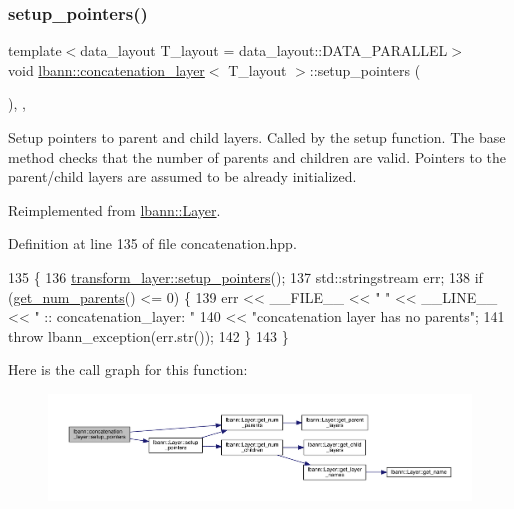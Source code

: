 \subsubsection{\texorpdfstring{setup\+\_\+pointers()}{setup\_pointers()}}
{\footnotesize\ttfamily template$<$data\+\_\+layout T\+\_\+layout = data\+\_\+layout\+::\+D\+A\+T\+A\+\_\+\+P\+A\+R\+A\+L\+L\+EL$>$ \\
void \hyperlink{classlbann_1_1concatenation__layer}{lbann\+::concatenation\+\_\+layer}$<$ T\+\_\+layout $>$\+::setup\+\_\+pointers (\begin{DoxyParamCaption}{ }\end{DoxyParamCaption})\hspace{0.3cm}{\ttfamily [inline]}, {\ttfamily [override]}, {\ttfamily [virtual]}}

Setup pointers to parent and child layers. Called by the setup function. The base method checks that the number of parents and children are valid. Pointers to the parent/child layers are assumed to be already initialized. 

Reimplemented from \hyperlink{classlbann_1_1Layer_a71b7a62afd9b73c23b2c0267b8ba0981}{lbann\+::\+Layer}.



Definition at line 135 of file concatenation.\+hpp.


\begin{DoxyCode}
135                                  \{
136     \hyperlink{classlbann_1_1Layer_a71b7a62afd9b73c23b2c0267b8ba0981}{transform\_layer::setup\_pointers}();
137     std::stringstream err;
138     \textcolor{keywordflow}{if} (\hyperlink{classlbann_1_1Layer_ac9290d4a6453ccda5f6b4d8b57b49ba3}{get\_num\_parents}() <= 0) \{
139       err << \_\_FILE\_\_ << \textcolor{stringliteral}{" "} << \_\_LINE\_\_ << \textcolor{stringliteral}{" :: concatenation\_layer: "}
140           << \textcolor{stringliteral}{"concatenation layer has no parents"};
141       \textcolor{keywordflow}{throw} lbann\_exception(err.str());
142     \}
143   \}
\end{DoxyCode}
Here is the call graph for this function\+:\nopagebreak
\begin{figure}[H]
\begin{center}
\leavevmode
\includegraphics[width=350pt]{classlbann_1_1concatenation__layer_a20c1588e7a506bc7b0acb4d63586ece9_cgraph}
\end{center}
\end{figure}


